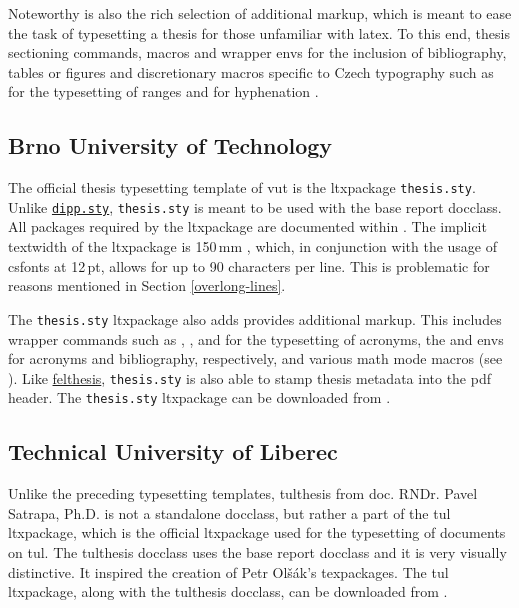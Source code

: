 \documentclass[12pt,twoside,cover,color,table]%
  {fithesis3/fithesis3/fithesis3} %
\begin{document}
  Noteworthy is also the rich selection of additional markup, which
  is meant to ease the task of typesetting a thesis for those
  unfamiliar with \gls{latex}. To this end, thesis sectioning
  commands, macros and wrapper \glspl{env} for the inclusion of
  bibliography, tables or figures and discretionary macros specific
  to Czech typography such as  for the typesetting of ranges
  and  for hyphenation
  \cite{dippman}.

  \subsection{Brno University of Technology}
  The official thesis typesetting template of \gls{vut} is the
  \gls{ltxpackage} \texttt{thesis.sty}. Unlike
  \texttt{\hyperref[sec:dipp.sty]{\tt dipp.sty}},
  \texttt{thesis.sty} is meant to be used with the base report
  \gls{docclass}. All packages required by the \gls{ltxpackage} are
  documented within \cite[p.~9]{thesis.sty-doc}\pending{}. The
  implicit \gls{textwidth} of the \gls{ltxpackage} is 150\,mm
  \cite[p.~2]{thesis.sty-doc}, which, in conjunction with the usage
  of \gls{csfonts} at 12\,pt, allows for up to 90 characters per
  line. This is problematic for reasons mentioned in Section
  \ref{overlong-lines}.

  The \texttt{thesis.sty} \gls{ltxpackage} also adds provides
  additional markup. This includes wrapper commands such as
  , ,  and  for
  the typesetting of acronyms, the  and
   \glspl{env} for acronyms and bibliography,
  respectively, and various math mode macros (see
  \cite[p.~6--9]{thesis.sty-doc}). Like
  \hyperref[sec:felthesis]{felthesis}, \texttt{thesis.sty} is also
  able to stamp thesis metadata into the \gls{pdf} header. The
  \texttt{thesis.sty} \gls{ltxpackage} can be downloaded from
  \cite{thesis.sty}.

  \subsection{Technical University of Liberec}
  Unlike the preceding typesetting templates, tulthesis from doc.
  RNDr. Pavel Satrapa, Ph.D. is not a standalone \gls{docclass},
  but rather a part of the tul \gls{ltxpackage}, which is the
  official \gls{ltxpackage} used for the typesetting of documents
  on \gls{tul}. The tulthesis \gls{docclass} uses the base report
  \gls{docclass} \cite[section~1]{tulthesis-man} and it is very
  visually distinctive. It inspired \cite[post~21]{ctustyle-forums}
  the creation of Petr Olšák's 
  \glspl{texpackage}. The tul \gls{ltxpackage}, along with the
  tulthesis \gls{docclass}, can be downloaded from \cite{tul}.
\end{document}

